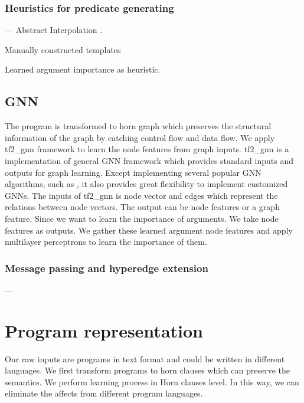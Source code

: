 \documentclass{article}
\begin{document}
\subsubsection{Heuristics for predicate generating}
---
Abstract Interpolation \cite{10.1007/978-3-319-57288-8_18}.

Manually constructed templates \cite{10.1007/978-3-319-57288-8_18}

Learned argument importance as heuristic.

\subsection{GNN}
The program is transformed to horn graph which preserves the structural information of the graph by catching control flow and data flow. We apply tf2\_gnn framework to learn the node features from graph inputs. tf2\_gnn is a implementation of general GNN framework which provides standard inputs and outputs for graph learning. Except implementing several popular GNN algorithms, such as \cite{2017arXiv171010903V,schlichtkrull2017modeling}, it also provides great flexibility to implement customized GNNs. The inputs of tf2\_gnn is node vector and edges which represent the relations between node vectors. The output can be node features or a graph feature. Since we want to learn the importance of arguments. We take node features as outputs. We gather these learned argument node features and apply multilayer perceptrons to learn the importance of them.

\subsubsection{Message passing and hyperedge extension}
---





\section{Program representation}
Our raw inputs are programs in text format and could be written in different languages. We first transform programs to horn clauses which can preserve the semantics. We perform learning process in Horn clauses level. In this way, we can eliminate the affects from different program languages.
\end{document}
